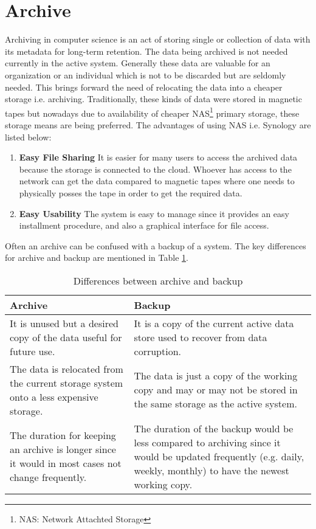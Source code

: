 \section{Archive}
Archiving in computer science is an act of storing single or collection of data with its metadata for long-term retention. The data being archived is 
not needed currently in the active system. Generally these data are valuable for an organization or an individual which is not to be discarded but are seldomly needed. 
This brings forward the need of relocating the data into a cheaper storage i.e. archiving. Traditionally, these kinds of data were stored in magnetic tapes but nowadays 
due to availability of cheaper NAS\footnote{NAS: Network Attachted Storage} primary storage, 
these storage means are being preferred. 
The advantages of using NAS i.e. Synology \cite{Synology} are listed below:
\begin{enumerate}
    \item \textbf{Easy File Sharing} It is easier for many users to access the archived data because the storage is connected to the cloud. Whoever has access to the
    network can get the data compared to magnetic tapes where one needs to physically posses the tape in order to get the required data.
    \item \textbf{Easy Usability} The system is easy to manage since it provides an easy installment procedure, and also a graphical interface for file access.
\end{enumerate}
Often an archive can be confused
with a backup of a system. The key differences for archive and backup are mentioned in Table \ref{table:archiveVsBackup}.

\begin{table}[H]
    \centering
    \begin{tabular}{|p{7cm}|p{7cm}|}
        \hline
            \textbf{Archive}  & \textbf{Backup}\\
        \hline
            It is unused but a desired copy of the data useful for future use.& 
            It is a copy of the current active data store used to recover from data corruption. \\
        \hline
            The data is relocated from the current storage system onto a less expensive storage.
            & The data is just a copy of the working copy and may or may not be stored in the same storage as the active system.\\
        \hline
             The duration for keeping an archive is longer since it would in most cases not change frequently.
             & The duration of the backup would be less compared to archiving since it would be updated frequently (e.g. daily, weekly, monthly) to have the newest 
             working copy.\\
        \hline
    \end{tabular}
    \caption{Differences between archive and backup}
    \label{table:archiveVsBackup}     
\end{table}    